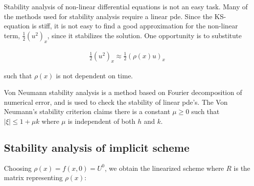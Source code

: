 

Stability analysis of non-linear differential equations is not an easy task. Many of the methods used for stability analysis require a linear pde. Since the KS-equation is stiff, it is not easy to find a good approximation for the non-linear term, $\frac{1}{2}(u^2)_x$, since it stabilizes the solution. One opportunity is to substitute 

\begin{align*}
\frac{1}{2}(u^2)_x \approx \frac{1}{2}(\rho(x)u)_x
\end{align*} 

such that $\rho(x)$ is not dependent on time. 

Von Neumann stability analysis is a method based on Fourier decomposition of numerical error, and is used to check the stability of linear pde's. The Von Neumann's stability criterion claims there is a constant $\mu \ge 0$ such that $|\xi| \le 1+ \mu k$ where $\mu$ is independent of both $h$ and $k$.


\subsection{Stability analysis of implicit scheme}

 
Choosing $\rho(x) = f(x,0) = U^0$, we obtain the linearized scheme where $R$ is the matrix representing $\rho(x)$:


